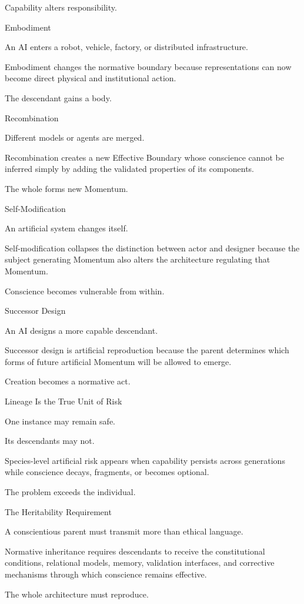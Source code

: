 Capability alters responsibility.

Embodiment

An AI enters a robot, vehicle, factory, or distributed infrastructure.

Embodiment changes the normative boundary because representations can now become direct physical and institutional action.

The descendant gains a body.

Recombination

Different models or agents are merged.

Recombination creates a new Effective Boundary whose conscience cannot be inferred simply by adding the validated properties of its components.

The whole forms new Momentum.

Self-Modification

An artificial system changes itself.

Self-modification collapses the distinction between actor and designer because the subject generating Momentum also alters the architecture regulating that Momentum.

Conscience becomes vulnerable from within.

Successor Design

An AI designs a more capable descendant.

Successor design is artificial reproduction because the parent determines which forms of future artificial Momentum will be allowed to emerge.

Creation becomes a normative act.

Lineage Is the True Unit of Risk

One instance may remain safe.

Its descendants may not.

Species-level artificial risk appears when capability persists across generations while conscience decays, fragments, or becomes optional.

The problem exceeds the individual.

The Heritability Requirement

A conscientious parent must transmit more than ethical language.

Normative inheritance requires descendants to receive the constitutional conditions, relational models, memory, validation interfaces, and corrective mechanisms through which conscience remains effective.

The whole architecture must reproduce.


